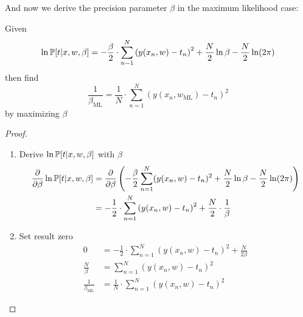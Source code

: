 And now we derive the precision parameter $\beta$ in the maximum likelihood case:

\begin{theorem}
  Given
  \[ \ln{\mathbb P[t | x, w, \beta]} = -\frac{\beta}{2} \cdot \sum_{n-1}^N \left(y(x_n,w) - t_n\right)^2 + \frac{N}2 \ln{\beta} - \frac{N}{2} \ln(2\pi) \]
  then find
  \[ \frac{1}{\beta_{\text{ML}}} = \frac{1}{N} \cdot \sum_{n=1}^N (y(x_n, w_{\text{ML}}) - t_n)^2 \] by maximizing $\beta$
\end{theorem}

\begin{proof}
\begin{enumerate}
  \item Derive $\ln{\mathbb P[t | x,w,\beta]}$ with $\beta$
    \begin{align*}
      \frac{\partial}{\partial \beta} \ln{\mathbb P[t | x,w,\beta]}
      &= \frac{\partial}{\partial \beta} \left(-\frac{\beta}{2} \sum_{n=1}^N (y(x_n,w) - t_n)^2 + \frac{N}{2} \ln\beta - \frac{N}{2} \ln(2\pi)\right) \\
      &= -\frac12 \cdot \sum_{n=1}^N \left(y(x_n,w) - t_n\right)^2 + \frac{N}{2} \cdot \frac1\beta
    \end{align*}
  \item Set result zero
    \begin{align*}
      0 &= -\frac{1}{2} \cdot \sum_{n=1}^N \left(y(x_n,w) - t_n\right)^2 + \frac{N}{2\beta} \\
      \frac{N}{\beta} &= \sum_{n=1}^N \left(y(x_n,w) - t_n\right)^2 \\
      \frac{1}{\beta_{\text{ML}}} &= \frac{1}{N} \cdot \sum_{n=1}^N (y(x_n,w) - t_n)^2
    \end{align*}
\end{enumerate}
\end{proof}


